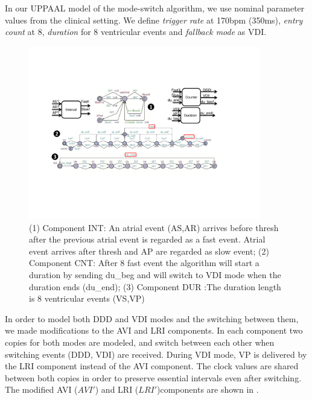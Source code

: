 In our UPPAAL model of the mode-switch algorithm, we use nominal parameter values from the clinical setting. We define \emph{trigger rate} at 170bpm (350ms), \emph{entry count} at 8, \emph{duration} for 8 ventricular events and \emph{fallback mode} as VDI. 
\begin{figure}
		\centering
		\includegraphics[width=0.9\textwidth]{figs/duration.pdf}
		\caption{\small (1) Component \textsf{INT}: An atrial event (\textsf{AS,AR}) arrives before \textsf{thresh} after the previous atrial event is regarded as a \textsf{fast} event. Atrial event arrives after \textsf{thresh} and \textsf{AP} are regarded as \textsf{slow} event; (2) Component \textsf{CNT}: After 8 \textsf{fast} event the algorithm will start a duration by sending \textsf{du\_beg} and will switch to \textsf{VDI} mode when the duration ends (\textsf{du\_end}); (3) Component \textsf{DUR} :The duration length is 8 ventricular events (\textsf{VS,VP})}
		\label{fig:dur_count}
\end{figure} 

In order to model both DDD and VDI modes and the switching between them, we made modifications to the AVI and LRI components.
In each component two copies for both modes are modeled, and switch between each other when switching events (DDD, VDI) are received. During VDI mode, \textsf{VP} is delivered by the LRI component instead of the AVI component. The clock values are shared between both copies in order to preserve essential intervals even after switching. The modified AVI ($AVI'$) and LRI ($LRI'$)components are shown in . 


